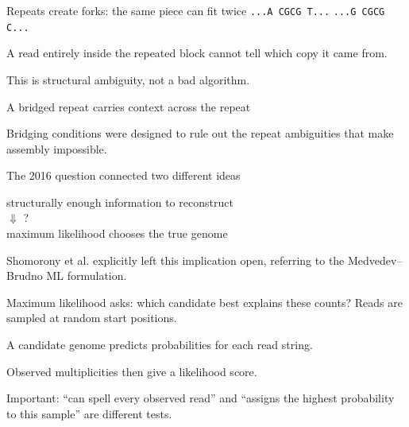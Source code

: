 \documentclass[aspectratio=169]{beamer}
\newcommand{\genome}[1]{\texttt{#1}}
\begin{document}
\begin{frame}{Repeats create forks: the same piece can fit twice}
\centering
\Large \genome{...A \alert{CGCG} T...}\qquad
\genome{...G \alert{CGCG} C...}\par\bigskip
\normalsize A read entirely inside the repeated block cannot tell which copy it came from.\par\medskip
\alert{This is structural ambiguity, not a bad algorithm.}
\end{frame}

\begin{frame}{A bridged repeat carries context across the repeat}
\centering
{}
\par\bigskip
Bridging conditions were designed to rule out the repeat ambiguities that make assembly impossible.
\end{frame}

\begin{frame}{The 2016 question connected two different ideas}
\Large
\begin{center}
structurally enough information to reconstruct
\\[1em] $\Downarrow$ ? \\[1em]
maximum likelihood chooses the true genome
\end{center}
\normalsize
Shomorony et al. explicitly left this implication open, referring to the Medvedev--Brudno ML formulation.
\end{frame}

\begin{frame}{Maximum likelihood asks: which candidate best explains these counts?}
\centering
\Large Reads are sampled at random start positions.\par\bigskip
\normalsize A candidate genome predicts probabilities for each read string.\par\medskip
Observed multiplicities then give a likelihood score.\par\bigskip
\alert{Important: ``can spell every observed read'' and ``assigns the highest probability to this sample'' are different tests.}
\end{frame}
\end{document}
